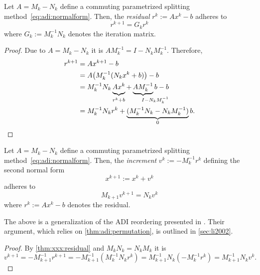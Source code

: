 \begin{proposition}
\label{thm:xxx:residual}
  Let $A = M_k - N_k$ define a commuting parametrized splitting method~\eqref{eq:adi:normalform}.
  Then, the \emph{residual} $r^k := Ax^k - b$ adheres to
  \begin{equation*}
    r^{k+1} = G_k r^k
  \end{equation*}
  where $G_k := M_k^{-1} N_k$ denotes the iteration matrix.
\end{proposition}
\begin{proof}
  Due to $A = M_k - N_k$ it is $AM_k^{-1} = I - N_k M_k^{-1}$.
  Therefore,
  \begin{align*}
    r^{k+1}
    &= Ax^{k+1} - b \\
    &= A \big( M_k^{-1} (N_k x^k + b) \big) - b \\
    &= M_k^{-1} N_k \underbrace{
      \vphantom{M_k^{-1}}
      Ax^k
    }_{
      \vphantom{M_k^{-1}}
      r^k + b
    }
    + \underbrace{
      A M_k^{-1}
    }_{
      I\mathrlap{{} - N_k M_k^{-1}}
    } b - b \\
    &= M_k^{-1} N_k r^k + \underbrace{
      (M_k^{-1} N_k - N_k M_k^{-1})
    }_0 b
    .
  \end{align*}
\end{proof}

\begin{corollary}
\label{thm:adi:increment-form}
  Let $A = M_k - N_k$ define a commuting parametrized splitting method~\eqref{eq:adi:normalform}.
  Then, the \emph{increment} $v^k := - M_k^{-1} r^k$ defining the second normal form
  \begin{equation*}
    x^{k+1} := x^k + v^k
  \end{equation*}
  adheres to
  \begin{equation*}
    M_{k+1} v^{k+1} = N_k v^k
  \end{equation*}
  where $r^k := Ax^k - b$ denotes the residual.
\end{corollary}

\begin{remark}
  The above is a generalization of the \ac{ADI} reordering presented in \cite{Li2002}.
  Their argument,
  which relies on \autoref{thm:adi:permutation},
  is outlined in \autoref{sec:li2002}.
\end{remark}

\begin{proof}
  By \autoref{thm:xxx:residual} and $M_k N_k = N_k M_k$ it is
  \begin{equation*}
    v^{k+1}
    = - M_{k+1}^{-1} r^{k+1}
    = -M_{k+1}^{-1} (M_k^{-1} N_k r^k)
    = M_{k+1}^{-1} N_k (- M_k^{-1} r^k)
    = M_{k+1}^{-1} N_k v^k
    .
  \end{equation*}
\end{proof}

